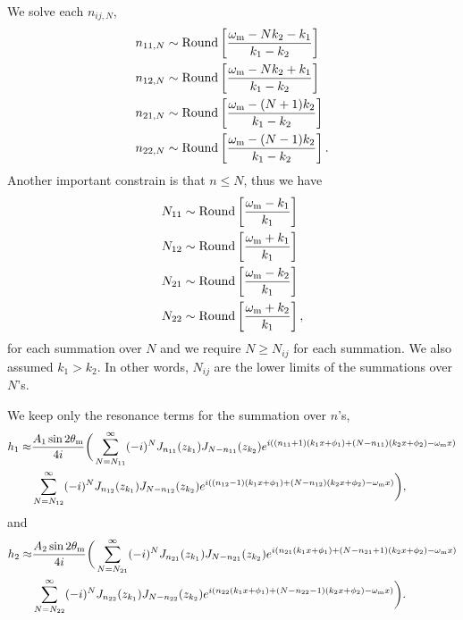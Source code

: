 We solve each $n_{ij,N}$,
\begin{align}
   n_{11,N} &\sim \mathrm{Round}\left[\frac{\omega_\mathrm m - N k_2 -k_1}{k_1 - k_2} \right] \\
   n_{12,N} &\sim \mathrm{Round}\left[\frac{\omega_\mathrm m - N k_2 + k_1}{k_1 - k_2}\right] \\
   n_{21,N} &\sim \mathrm{Round}\left[\frac{\omega_\mathrm m - (N + 1) k_2 }{k_1 - k_2} \right]\\
   n_{22,N} &\sim \mathrm{Round}\left[\frac{\omega_\mathrm m - (N - 1) k_2 }{k_1 - k_2} \right].
\end{align}
Another important constrain is that $n\leq N$, thus we have
\begin{align}
   N_{11} &\sim \mathrm{Round}\left[\frac{\omega_\mathrm m - k_1}{k_1}\right] \\
   N_{12} &\sim \mathrm{Round}\left[\frac{\omega_\mathrm m + k_1}{k_1}\right] \\
   N_{21} &\sim \mathrm{Round}\left[\frac{\omega_\mathrm m - k_2}{k_1}\right] \\
   N_{22} &\sim \mathrm{Round}\left[\frac{\omega_\mathrm m + k_2}{k_1}\right],
\end{align}
for each summation over $N$ and we require $N\geq N_{ij}$ for each summation. We also assumed $k_1 > k_2$. In other words, $N_{ij}$ are the lower limits of the summations over $N$'s.

We keep only the resonance terms for the summation over $n$'s,
\begin{align}
   h_1 \approx & \frac{A_1\sin 2\theta_\mathrm m}{4i} \bigg( \sum_{N=N_{11}}^\infty (-i)^N J_{n_{11}} (z_{k_1}) J_{N-n_{11}}(z_{k_2}) e^{ i \left(  (n_{11}+1) (k_1 x + \phi_1) + (N-n_{11})(k_2 x + \phi_2) - \omega_\mathrm m x \right) }  \nonumber \\
   & \sum_{N=N_{12}}^\infty (-i)^N J_{n_{12}} (z_{k_1}) J_{N-n_{12}}(z_{k_2}) e^{ i \left(  (n_{12}-1) (k_1 x + \phi_1) + (N-n_{12})(k_2 x + \phi_2) - \omega_\mathrm m x \right) }\bigg),
\end{align}
and
\begin{align}
   h_2 \approx & \frac{A_2\sin 2\theta_\mathrm m}{4i} \bigg( \sum_{N=N_{21}}^\infty (-i)^N J_{n_{21}} (z_{k_1}) J_{N-n_{21}}(z_{k_2}) e^{ i \left(  n_{21} (k_1 x + \phi_1) + (N-n_{21} + 1)(k_2 x + \phi_2) - \omega_\mathrm m x \right) }  \nonumber \\
   & \sum_{N=N_{22}}^\infty (-i)^N J_{n_{22}} (z_{k_1}) J_{N-n_{22}}(z_{k_2}) e^{ i \left(  n_{22} (k_1 x + \phi_1) + (N-n_{22}-1)(k_2 x + \phi_2) - \omega_\mathrm m x \right) }\bigg) .
\end{align}

